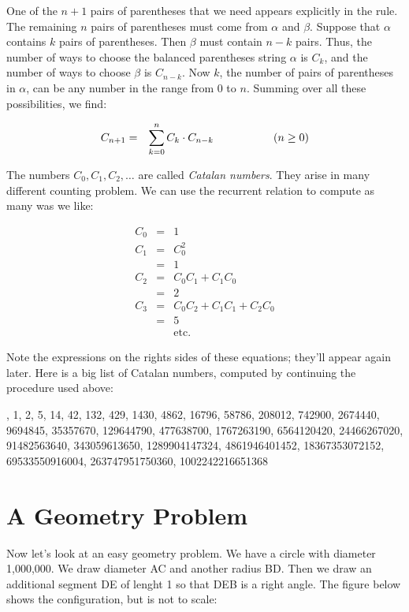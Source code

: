 \documentclass[twoside,12pt]{article}
\newcommand{\beqn}{\begin{eqnarray*}}
\newcommand{\eeqn}{\end{eqnarray*}}
\begin{document}
\noindent One of the $n+1$ pairs of parentheses that we need appears
explicitly in the rule.  The remaining $n$ pairs of parentheses must
come from $\alpha$ and $\beta$.  Suppose that $\alpha$ contains $k$
pairs of parentheses.  Then $\beta$ must contain $n - k$ pairs.  Thus,
the number of ways to choose the balanced parentheses string $\alpha$
is $C_k$, and the number of ways to choose $\beta$ is $C_{n-k}$.  Now
$k$, the number of pairs of parentheses in $\alpha$, can be any number
in the range from 0 to $n$.  Summing over all these possibilities, we
find:

\beqn
C_{n+1} & = & \sum_{k=0}^{n} C_k \cdot C_{n-k} \hspace{0.75in} (n \geq 0)
\eeqn

The numbers $C_0, C_1, C_2, \ldots$ are called {\em Catalan numbers}.
They arise in many different counting problem.  We can use the
recurrent relation to compute as many was we like:

\beqn
C_0	& = &	1 \\
C_1	& = &	C_0^2 \\
	& = &	1 \\
C_2	& = &	C_0 C_1 + C_1 C_0 \\
	& = &	2 \\
C_3	& = &	C_0 C_2 + C_1 C_1 + C_2 C_0 \\
	& = &	5 \\
	&   &	\text{etc.}
\eeqn

\noindent Note the expressions on the rights sides of these equations;
they'll appear again later.  Here is a big list of Catalan numbers,
computed by continuing the procedure used above:

, 1, 2, 5, 14, 42, 132, 429, 1430, 4862, 16796, 58786,
208012, 742900, 2674440, \\ 9694845, 35357670, 129644790, 477638700,
1767263190, 6564120420, 24466267020, \\ 91482563640, 343059613650,
1289904147324, 4861946401452, 18367353072152, \\ 69533550916004,
263747951750360, 1002242216651368

\section{A Geometry Problem}

Now let's look at an easy geometry problem.  We have a circle with
diameter 1,000,000.  We draw diameter AC and another radius BD.  Then
we draw an additional segment DE of lenght 1 so that DEB is a right
angle.  The figure below shows the configuration, but is not to scale:
\end{document}
